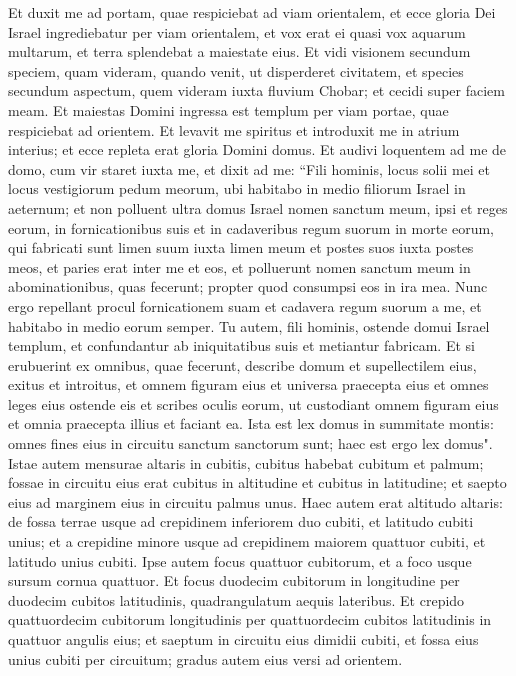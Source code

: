 \begin{biblechapter}  
\verse Et duxit me ad portam, quae respiciebat ad viam orientalem, 
\verse et ecce gloria Dei Israel ingrediebatur per viam orientalem, et vox erat ei quasi vox aquarum multarum, et terra splendebat a maiestate eius. 
\verse Et vidi visionem secundum speciem, quam videram, quando venit, ut disperderet civitatem, et species secundum aspectum, quem videram iuxta fluvium Chobar; et cecidi super faciem meam. 
\verse Et maiestas Domini ingressa est templum per viam portae, quae respiciebat ad orientem. 
\verse Et levavit me spiritus et introduxit me in atrium interius; et ecce repleta erat gloria Domini domus. 
\verse Et audivi loquentem ad me de domo, cum vir staret iuxta me, 
\verse et dixit ad me: “Fili hominis, locus solii mei et locus vestigiorum pedum meorum, ubi habitabo in medio filiorum Israel in aeternum; et non polluent ultra domus Israel nomen sanctum meum, ipsi et reges eorum, in fornicationibus suis et in cadaveribus regum suorum in morte eorum,  
\verse qui fabricati sunt limen suum iuxta limen meum et postes suos iuxta postes meos, et paries erat inter me et eos, et polluerunt nomen sanctum meum in abominationibus, quas fecerunt; propter quod consumpsi eos in ira mea. 
\verse Nunc ergo repellant procul fornicationem suam et cadavera regum suorum a me, et habitabo in medio eorum semper. 
\verse Tu autem, fili hominis, ostende domui Israel templum, et confundantur ab iniquitatibus suis et metiantur fabricam. 
\verse Et si erubuerint ex omnibus, quae fecerunt, describe domum et supellectilem eius, exitus et introitus, et omnem figuram eius et universa praecepta eius et omnes leges eius ostende eis et scribes oculis eorum, ut custodiant omnem figuram eius et omnia praecepta illius et faciant ea. 
\verse Ista est lex domus in summitate montis: omnes fines eius in circuitu sanctum sanctorum sunt; haec est ergo lex domus". 
\verse Istae autem mensurae altaris in cubitis, cubitus habebat cubitum et palmum; fossae in circuitu eius erat cubitus in altitudine et cubitus in latitudine; et saepto eius ad marginem eius in circuitu palmus unus. Haec autem erat altitudo altaris: 
\verse de fossa terrae usque ad crepidinem inferiorem duo cubiti, et latitudo cubiti unius; et a crepidine minore usque ad crepidinem maiorem quattuor cubiti, et latitudo unius cubiti. 
\verse Ipse autem focus quattuor cubitorum, et a foco usque sursum cornua quattuor. 
\verse Et focus duodecim cubitorum in longitudine per duodecim cubitos latitudinis, quadrangulatum aequis lateribus. 
\verse Et crepido quattuordecim cubitorum longitudinis per quattuordecim cubitos latitudinis in quattuor angulis eius; et saeptum in circuitu eius dimidii cubiti, et fossa eius unius cubiti per circuitum; gradus autem eius versi ad orientem. 

\end{biblechapter}
